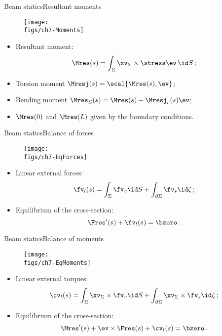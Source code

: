 \begin{frame}{Beam statics}{Resultant moments}

\begin{figure}
\centering\texttt{[image: \\figs/ch7-Moments]}
\end{figure}

\begin{itemize}
\item Resultant moment:
\begin{displaymath}
\Mres(s)=\int_\Sigma\xv_\Sigma\times\stress\ev\,\id S\,;
\end{displaymath}
\item Torsion moment $\Mresj(s)=\scal{\Mres(s),\ev}$;
\item Bending moment $\Mres_\Sigma(s)=\Mres(s)-\Mresj_e(s)\ev$;
\item $\Mres(0)$ and $\Mres(L)$ given by the boundary conditions.
\end{itemize}

\end{frame}

\begin{frame}{Beam statics}{Balance of forces}

\begin{figure}
\centering\texttt{[image: \\figs/ch7-EqForces]}
\end{figure}

\begin{itemize}
\item Linear external forces:
\begin{displaymath}
\fv_l(s)=\int_\Sigma\fv_v\id S + \int_{\partial\Sigma}\fv_s\id\zeta\,;
\end{displaymath}
\item Equilibrium of the cross-section:
\begin{displaymath}
\Fres'(s)+\fv_l(s)=\bzero\,.
\end{displaymath}
\end{itemize}

\end{frame}

\begin{frame}{Beam statics}{Balance of moments}

\begin{figure}
\centering\texttt{[image: \\figs/ch7-EqMoments]}
\end{figure}

\begin{itemize}
\item Linear external torques:
\begin{displaymath}
\cv_l(s)=\int_\Sigma\xv_\Sigma\times\fv_v\id S + \int_{\partial\Sigma}\xv_\Sigma\times\fv_s\id\zeta\,;
\end{displaymath}
\item Equilibrium of the cross-section:
\begin{displaymath}
\Mres'(s)+\ev\times\Fres(s)+\cv_l(s)=\bzero\,.
\end{displaymath}
\end{itemize}

\end{frame}


